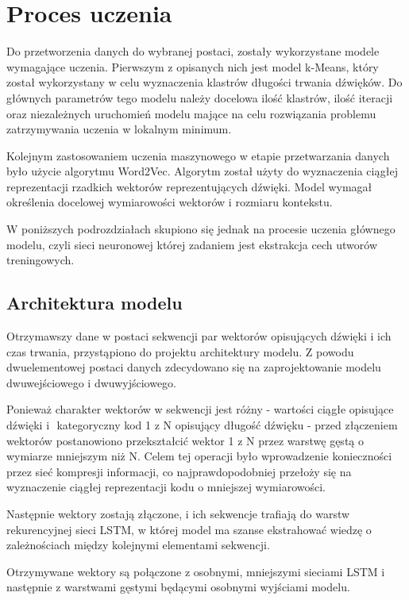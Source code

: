 \chapter{Proces uczenia} 
{
    Do przetworzenia danych do wybranej postaci, zostały wykorzystane modele wymagające uczenia.
    Pierwszym z\,\,opisanych nich jest model k-Means, który został wykorzystany w\,\,celu wyznaczenia klastrów
    długości trwania dźwięków. Do głównych parametrów tego modelu należy docelowa ilość klastrów, ilość iteracji
    oraz niezależnych uruchomień modelu mające na celu rozwiązania problemu zatrzymywania uczenia w\,\,lokalnym minimum.
    
    Kolejnym zastosowaniem uczenia maszynowego w\,\,etapie przetwarzania danych było użycie algorytmu Word2Vec. Algorytm 
    został użyty do wyznaczenia ciągłej reprezentacji rzadkich wektorów reprezentujących dźwięki. Model wymagał 
    określenia docelowej wymiarowości wektorów i\,\,rozmiaru kontekstu. 

    W\,\,poniższych podrozdziałach skupiono się jednak na procesie uczenia głównego modelu, czyli sieci neuronowej której
    zadaniem jest ekstrakcja cech utworów treningowych.

    \section{Architektura modelu}
    {
        Otrzymawszy dane w\,\,postaci sekwencji par wektorów opisujących dźwięki i\,\,ich czas trwania,
        przystąpiono do projektu architektury modelu. Z\,\,powodu dwuelementowej postaci danych
        zdecydowano się na zaprojektowanie modelu dwuwejściowego i\,\,dwuwyjściowego.

        Ponieważ charakter wektorów w\,\,sekwencji jest różny - wartości ciągłe opisujące dźwięki i\,\,
        kategoryczny kod 1 z\,\,N opisujący długość dźwięku - przed złączeniem wektorów postanowiono 
        przekształcić wektor 1 z\,\,N przez warstwę gęstą o\,\,wymiarze mniejszym niż\,\,N. Celem tej operacji
        było wprowadzenie konieczności przez sieć kompresji informacji, co najprawdopodobniej przełoży się 
        na wyznaczenie ciągłej reprezentacji kodu o\,\,mniejszej wymiarowości. 

        Następnie wektory zostają złączone, i\,\,ich sekwencje trafiają do warstw rekurencyjnej sieci LSTM,
        w\,\,której model ma szanse ekstrahować wiedzę o\,\,zależnościach między kolejnymi elementami sekwencji.

        Otrzymywane wektory są połączone z\,\,osobnymi, mniejszymi sieciami LSTM i\,\,następnie z\,\,warstwami 
        gęstymi będącymi osobnymi wyjściami modelu.
        
}}
